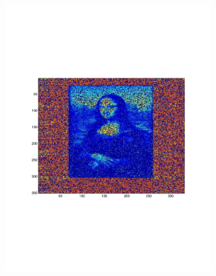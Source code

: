 \begin{figure}[h!tbp]
\begin{subfigure}[b]{0.3\textwidth}
        \includegraphics[width=\textwidth]{img/p5_m1_lam2.pdf}
    \end{subfigure}
    \begin{subfigure}[c]{0.3\textwidth}

\end{subfigure}
\end{figure}
